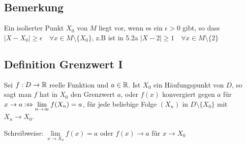 \documentclass[10pt, a4paper, fleqn]{article}
\begin{document}
    \subsection{Bemerkung}
    Ein isolierter Punkt $X_0$ von $M$ liegt vor, wenn es ein $\epsilon > 0$ gibt,
    so dass \\ $|X - X_0| \geq \epsilon \quad \forall x \in M \setminus \{X_0\}$,
    z.B ist in 5.2a $|X - 2| \geq 1 \quad \forall x \in M \setminus \{2\}$

    \subsection{Definition Grenzwert I}
    Sei $f: D \to \mathbb{R}$ reelle Funktion und $a \in \mathbb{R}$.
    Ist $X_0$ ein Häufungspunkt von $D$, so sagt man $f$ hat in $X_0$ den Grenzwert
    $a$, oder $f(x)$ konvergiert gegen $a$ für $x \to a :\Leftrightarrow \lim\limits_{n \to \infty} f(X_n) = a$,
    für jede beliebige Folge $(X_n)$ in $D \setminus \{X_0\}$ mit $X_n \to X_0$.

    Schreibweise: $\lim\limits_{x \to X_0} f(x) = a$ oder
    $f(x) \to a$ für $x \to X_0$
\end{document}
